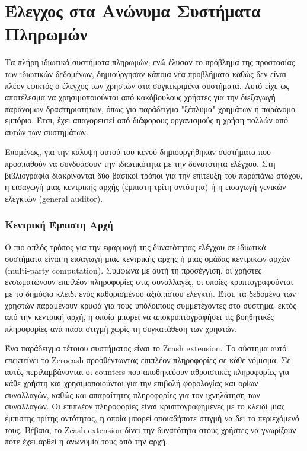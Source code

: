 \section{Έλεγχος στα Ανώνυμα Συστήματα Πληρωμών}
Τα πλήρη ιδιωτικά συστήματα πληρωμών, ενώ έλυσαν το πρόβλημα της προστασίας των ιδιωτικών δεδομένων, δημιούργησαν κάποια νέα προβλήματα καθώς δεν είναι πλέον εφικτός ο έλεγχος των χρηστών στα συγκεκριμένα συστήματα. Αυτό είχε ως αποτέλεσμα να χρησιμοποιούνται από κακόβουλους χρήστες για την διεξαγωγή παράνομων δραστηριοτήτων, όπως για παράδειγμα "ξέπλυμα" χρημάτων ή παράνομο εμπόριο. Έτσι, έχει απαγορευτεί από διάφορους οργανισμούς η χρήση πολλών από αυτών των συστημάτων.

Επομένως, για την κάλυψη αυτού του κενού δημιουργήθηκαν συστήματα που προσπαθούν να συνδυάσουν την ιδιωτικότητα με την δυνατότητα ελέγχου. Στη βιβλιογραφία διακρίνονται δύο βασικοί τρόποι για την επίτευξη του παραπάνω στόχου, η εισαγωγή μιας κεντρικής αρχής (έμπιστη τρίτη οντότητα) ή η εισαγωγή γενικών ελεγκτών (general auditor).

\subsubsection{Κεντρική Έμπιστη Αρχή}
Ο πιο απλός τρόπος για την εφαρμογή της δυνατότητας ελέγχου σε ιδιωτικά συστήματα είναι η εισαγωγή μιας κεντρικής αρχής ή μιας ομάδας κεντρικών αρχών (multi-party computation). Σύμφωνα με αυτή τη προσέγγιση, οι χρήστες ενσωματώνουν επιπλέον πληροφορίες στις συναλλαγές, οι οποίες κρυπτογραφούνται με το δημόσιο κλειδί ενός καθορισμένου αξιόπιστου ελεγκτή. Έτσι, τα δεδομένα των χρηστών παραμένουν κρυφά για τους υπόλοιπους συμμετέχοντες στο σύστημα, εκτός από την κεντρική αρχή, η οποία μπορεί να αποκρυπτογραφήσει τις βοηθητικές πληροφορίες ανά πάσα στιγμή χωρίς τη συγκατάθεση των χρηστών.

Ένα παράδειγμα τέτοιου συστήματος είναι το Zcash extension. Το σύστημα αυτό επεκτείνει το Zerocash προσθέντωντας επιπλέον πληροφορίες σε κάθε νόμισμα. Σε αυτές περιλαμβάνονται οι counters που αποθηκεύουν αθροιστικές πληροφορίες για κάθε χρήστη και χρησιμοποιούνται για την επιβολή φορολογίας και ορίων συναλλαγών, καθώς και απαραίτητες πληροφορίες για τον ιχνηλάτηση των συναλλαγών. Οι επιπλέον πληροφορίες είναι κρυπτογραφημένες με το κλειδί μιας έμπιστης τρίτης οντότητας, η οποία μπορεί οποιαδήποτε στιγμή να δει το περιεχόμενό τους. Βέβαια, το Zcash extension δίνει την δυνατότητα στους χρήστες να γνωρίζουν πότε έχει αρθεί η ανωνυμία τους από την αρχή.

